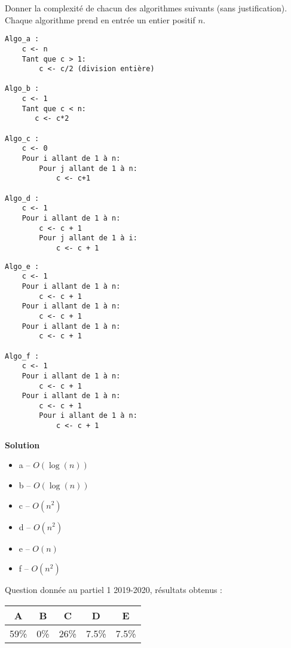 
\begin{exercice}[2019-20]

Donner la complexité de chacun des algorithmes suivants (sans justification). Chaque algorithme 
prend en entrée un entier positif $n$. 

\begin{minipage}[t]{0.48 \textwidth}
\begin{lstlisting}
Algo_a :
    c <- n
    Tant que c > 1:
        c <- c/2 (division entière)
            
Algo_b :
    c <- 1
    Tant que c < n:
       c <- c*2   
       
Algo_c :
    c <- 0
    Pour i allant de 1 à n:
        Pour j allant de 1 à n:
	        c <- c+1   
	        
Algo_d :
    c <- 1
    Pour i allant de 1 à n:
        c <- c + 1
        Pour j allant de 1 à i:
            c <- c + 1
\end{lstlisting}
\end{minipage}
\begin{minipage}[t]{0.48 \textwidth}
\begin{lstlisting}
Algo_e :
    c <- 1
    Pour i allant de 1 à n:
        c <- c + 1
    Pour i allant de 1 à n:
        c <- c + 1
    Pour i allant de 1 à n:
        c <- c + 1
        
Algo_f :
    c <- 1
    Pour i allant de 1 à n:
        c <- c + 1
    Pour i allant de 1 à n:
        c <- c + 1
        Pour i allant de 1 à n:
            c <- c + 1
\end{lstlisting}
\end{minipage}

\textbf{Solution}


\begin{itemize}
\item a -- $O(\log(n))$
\item b -- $O(\log(n))$
\item c -- $O(n^2)$
\item d -- $O(n^2)$
\item e -- $O(n)$
\item f -- $O(n^2)$
\end{itemize}


Question donnée au partiel 1 2019-2020, résultats obtenus :

\begin{tabular}{|c|c|c|c|c|}
\hline
A & B & C & D & E \\ \hline
59\% & 0\% & 26\% & 7.5\% & 7.5\% \\ \hline
\end{tabular} 


\end{exercice}